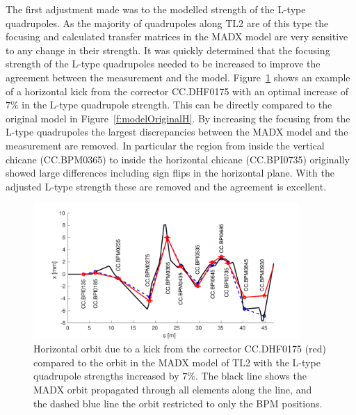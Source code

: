 The first adjustment made was to the modelled strength of the L-type quadrupoles. As the majority of quadrupoles along TL2 are of this type the focusing and calculated transfer matrices in the MADX model are very sensitive to any change in their strength. It was quickly determined that the focusing strength of the L-type quadrupoles needed to be increased to improve the agreement between the measurement and the model. Figure~\ref{f:modelCorrQuadH} shows an example of a horizontal kick from the corrector CC.DHF0175 with an optimal increase of \(7\%\) in the L-type quadrupole strength. This can be directly compared to the original model in Figure~\ref{f:modelOriginalH}. By increasing the focusing from the L-type quadrupoles the largest discrepancies between the MADX model and the measurement are removed. In particular the region from inside the vertical chicane (CC.BPM0365) to inside the horizontal chicane (CC.BPI0735) originally showed large differences including sign flips in the horizontal plane. With the adjusted L-type strength these are removed and the agreement is excellent.

\begin{figure}
  \centering
  \includegraphics[width=0.9\textwidth]{Figures/optics/modelCorrQuadH}
  \caption{Horizontal orbit due to a kick from the corrector CC.DHF0175 (red) compared to the orbit in the MADX model of TL2 with the L-type quadrupole strengths increased by \(7\%\). The black line shows the MADX orbit propagated through all elements along the line, and the dashed blue line the orbit restricted to only the BPM positions.}
  \label{f:modelCorrQuadH}
\end{figure}

